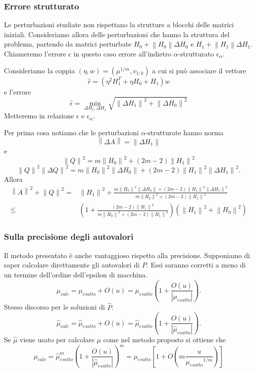 \documentclass{beamer}
\newcommand{\norm}[1]{\left\lVert#1\right\rVert}
\begin{document}
\begin{frame}
\frametitle{Errore strutturato}
    Le perturbazioni studiate non rispettano la strutture a blocchi delle
    matrici iniziali. Consideriamo allora delle perturbazioni che hanno la
    struttura del problema, partendo da matrici perturbate $H_0+\norm{H_0}\Delta 
    H_0$ e $H_1+\norm{H_1}\Delta H_1$.
    Chiameremo l'errore $\epsilon$ in questo caso errore all'indietro
    $\alpha$-strutturato $\epsilon_\alpha$.

    Consideriamo la coppia $(\eta, w)=(\mu^{1/m}, v_{1:k})$ a cui si pu\`o
    associare il vettore
    \[
        \hat{r} = (\eta^2H_1^T+\eta H_0 + H_1)w
    \]
    e l'errore
    \[
        \hat{\epsilon} = \min_{\Delta H_1, \Delta H_1} \sqrt{\norm{\Delta H_1}^2
        + \norm{\Delta H_0}^2}
    \]
    Metteremo in relazione $\epsilon$ e $\epsilon_\alpha$.
\end{frame}


\begin{frame}
    Per prima cosa notiamo che le perturbazioni $\alpha$-strutturate hanno norma
    \[
        \norm{\Delta A} = \norm{\Delta H_1}
    \]
    e
    \[
        \norm{Q}^2 = m\norm{H_0}^2 + (2m-2)\norm{H_1}^2
    \]
    \[
        \norm{Q}^2\norm{\Delta Q}^2 = m\norm{H_0}^2 \norm{\Delta H_0} +
        (2m-2)\norm{H_1}^2 \norm{\Delta H_1}^2.
    \]
    Allora 
    \begin{align*}
        \norm{A}^2+\norm{Q}^2 =& \norm{H_1}^2 + \frac
        {m\norm{H_0}^2 \norm{\Delta H_0} + (2m-2)\norm{H_1}^2 \norm{\Delta
        H_1}^2}
        {m\norm{H_0}^2 + (2m-2)\norm{H_1}^2}\\
        \leq& \left( 1 + \frac{(2m-2)\norm{H_1}^2}{m\norm{H_0}^2 + (2m-2)
        \norm{H_1}^2}\right)(\norm{H_1}^2+\norm{H_0}^2)
    \end{align*}

\end{frame}

\begin{frame}
\frametitle{Sulla precisione degli autovalori}
    Il metodo presentato \`e anche vantaggioso rispetto alla precisione.
    Supponiamo di saper calcolare direttamente gli autovalori di $P$. Essi
    saranno corretti a meno di un termine dell'ordine dell'epsilon di macchina.
    \[
        \mu_{calc} = \mu_{esatto} + O(u) = \mu_{esatto} \left(1+\frac {O(u)}
        {|\mu_{esatto}|}\right).
    \]
    Stesso discorso per le soluzioni di $\hat{P}$.
    \[
        \hat{\mu}_{calc} = \hat{\mu}_{esatto} + O(u) = \hat{\mu}_{esatto}
        \left(1+\frac {O(u)} {|\hat{\mu}_{esatto}|}\right).
    \]
    Se $\hat{\mu}$ viene usato per calcolare $\mu$ come nel metodo proposto si
    ottiene che
    \[
        \mu_{calc} = \hat{\mu}_{esatto}^m \left(1+\frac {O(u)}
        {|\hat{\mu}_{esatto}|}\right)^m
        = \mu_{esatto} \left[1+O\left(m\frac {u}
        {{\mu_{esatto}}^{1/m}}\right)\right]
    \]
\end{frame}
\end{document}
